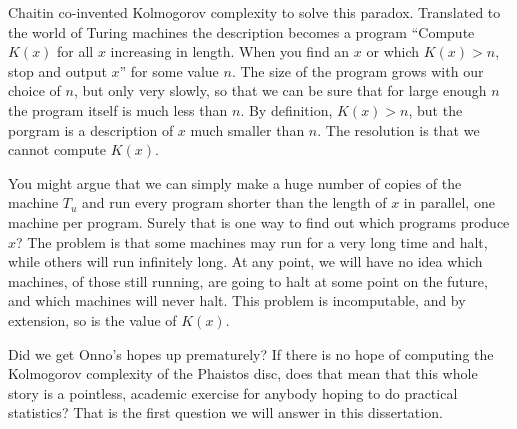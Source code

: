 

Chaitin co-invented Kolmogorov complexity to solve this paradox. Translated to the world of Turing machines the description becomes a program ``Compute $K(x)$ for all $x$ increasing in length. When you find an $x$ or which $K(x) > n$, stop and output $x$'' for some value $n$. The size of the program grows with our choice of $n$, but only very slowly, so that we can be sure that for large enough $n$ the program itself is much less than $n$. By definition, $K(x) > n$, but the porgram is a description of $x$ much smaller than $n$. The resolution is that we cannot compute $K(x)$. 

You might argue that we can simply make a huge number of copies of the machine $T_u$ and run every program shorter than the length of $x$ in parallel, one machine per program. Surely that is one way to find out which programs produce $x$? The problem is that some machines may run for a very long time and halt, while others will run infinitely long. At any point, we will have no idea which machines, of those still running, are going to halt at some point on the future, and which machines will never halt. This problem is incomputable, and by extension, so is the value of $K(x)$.

Did we get Onno's hopes up prematurely? If there is no hope of computing the Kolmogorov complexity of the Phaistos disc, does that mean that this whole story is a pointless, academic exercise for anybody hoping to do practical statistics? That is the first question we will answer in this dissertation.
